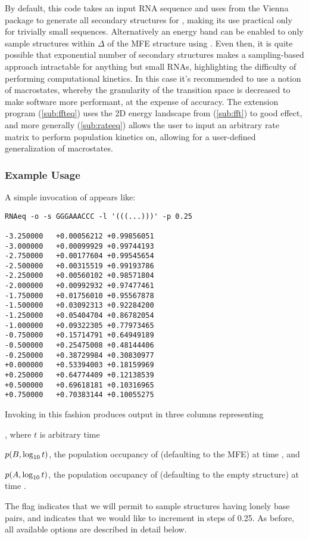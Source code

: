\documentclass[11pt]{article}
\begin{document}
By default, this code takes an input RNA sequence \s and uses  from the Vienna package to generate all secondary structures for \s, making its use practical only for trivially small sequences. Alternatively an energy band can be enabled to only sample structures within $\Delta$ \kcalMol of the MFE structure using . Even then, it is quite possible that exponential number of secondary structures makes a sampling-based approach intractable for anything but small RNAs, highlighting the difficulty of performing computational kinetics. In this case it's recommended to use a notion of macrostates, whereby the granularity of the transition space is decreased to make software more performant, at the expense of accuracy. The extension program \ffteq (\ref{sub:ffteq}) uses the 2D energy landscape from \fft (\ref{sub:fft}) to good effect, and more generally \rateeq (\ref{sub:rateeq}) allows the user to input an arbitrary rate matrix to perform population kinetics on, allowing for a user-defined generalization of macrostates.

\subsubsection{Example Usage} \label{subsub:rnaeqex}

\noindent A simple invocation of \rnaeq appears like:

\begin{verbatim}
RNAeq -o -s GGGAAACCC -l '(((...)))' -p 0.25

-3.250000	+0.00056212	+0.99856051
-3.000000	+0.00099929	+0.99744193
-2.750000	+0.00177604	+0.99545654
-2.500000	+0.00315519	+0.99193786
-2.250000	+0.00560102	+0.98571804
-2.000000	+0.00992932	+0.97477461
-1.750000	+0.01756010	+0.95567878
-1.500000	+0.03092313	+0.92284200
-1.250000	+0.05404704	+0.86782054
-1.000000	+0.09322305	+0.77973465
-0.750000	+0.15714791	+0.64949189
-0.500000	+0.25475008	+0.48144406
-0.250000	+0.38729984	+0.30830977
+0.000000	+0.53394003	+0.18159969
+0.250000	+0.64774409	+0.12138539
+0.500000	+0.69618181	+0.10316965
+0.750000	+0.70383144	+0.10055275
\end{verbatim}

Invoking \rnaeq in this fashion produces output in three columns representing
\begin{inparaenum}
  \item \logt, where $t$ is arbitrary time
  \item $p(B, \log_{10} t)$, the population occupancy of \B (defaulting to the MFE) at time \logt, and
  \item $p(A, \log_{10} t)$, the population occupancy of \A (defaulting to the empty structure) at time \logt.
\end{inparaenum}
The  flag indicates that we will permit  to sample structures having lonely base pairs, and  indicates that we would like \logt to increment in steps of 0.25. As before, all available options are described in detail below.
\end{document}
